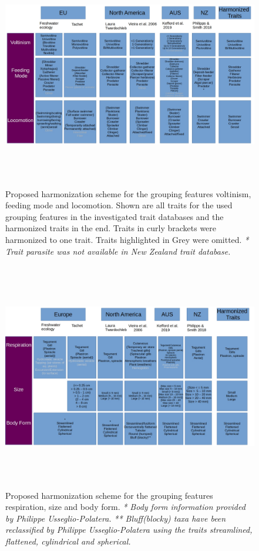 \documentclass{article}
\begin{document}
\begin{figure}[H]
   \centering
   \includegraphics[width=16.5cm, height=10cm]{trait_overview1.jpg}
   \caption{Proposed harmonization scheme for the grouping features
   voltinism, feeding mode and locomotion. Shown are all traits for the 
   used grouping features in the investigated trait databases and 
   the harmonized traits in the end. Traits in curly brackets were 
   harmonized to one trait. Traits highlighted in Grey were omitted. \newline
   \textit{* Trait parasite was not available in New Zealand trait database.}
   }
   \label{fig:harmon_overview_1}
\end{figure}

\begin{figure}[H]
    \centering
    \includegraphics[width=16.5cm, height=10cm]{trait_overview2.jpg}
    \caption{Proposed harmonization scheme for the grouping features
    respiration, size and body form.\newline
    \textit{* Body form information provided by Philippe 
    Usseglio-Polatera.}\newline
    \textit{** Bluff(blocky) taxa have been reclassified
    by Philippe Usseglio-Polatera using the traits streamlined,
    flattened, cylindrical and spherical.} }
    \label{fig:harmon_overview_2}
 \end{figure}
\end{document}

